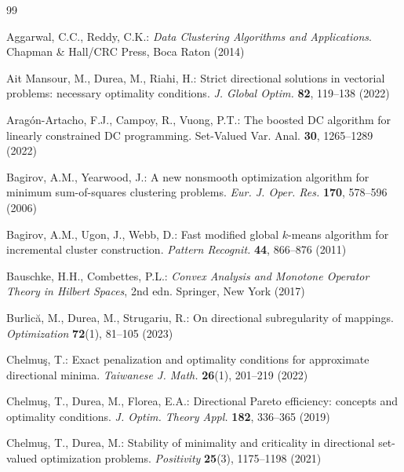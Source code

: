 \documentclass[sn-mathphys-num]{sn-jnl}%
\theoremstyle{definition}
\begin{document}
	
	\begin{thebibliography}{99}
		
		Aggarwal, C.C., Reddy, C.K.:
		\textit{Data Clustering Algorithms and Applications}.
		Chapman \& Hall/CRC Press, Boca Raton (2014)
		
		Ait Mansour, M., Durea, M., Riahi, H.:
		Strict directional solutions in vectorial problems: necessary optimality conditions.
		\textit{J. Global Optim.} \textbf{82}, 119--138 (2022)
		
		Aragón-Artacho, F.J., Campoy, R., Vuong, P.T.: The boosted DC algorithm for linearly constrained DC programming. Set-Valued Var. Anal. \textbf{30}, 1265--1289 (2022)
		
		Bagirov, A.M., Yearwood, J.:
		A new nonsmooth optimization algorithm for minimum sum-of-squares clustering problems.
		\textit{Eur. J. Oper. Res.} \textbf{170}, 578--596 (2006)
		
		Bagirov, A.M., Ugon, J., Webb, D.:
		Fast modified global $k$-means algorithm for incremental cluster construction.
		\textit{Pattern Recognit.} \textbf{44}, 866--876 (2011)
		
		
		Bauschke, H.H., Combettes, P.L.:
		\textit{Convex Analysis and Monotone Operator Theory in Hilbert Spaces}, 2nd edn.
		Springer, New York (2017)
		
		Burlic{\u{a}}, M., Durea, M., Strugariu, R.:
		On directional subregularity of mappings.
		\textit{Optimization} \textbf{72}(1), 81--105 (2023)
		
		Chelmu\c{s}, T.:
		Exact penalization and optimality conditions for approximate directional minima.
		\textit{Taiwanese J. Math.} \textbf{26}(1), 201--219 (2022)
		
		Chelmu{\c{s}}, T., Durea, M., Florea, E.A.:
		Directional Pareto efficiency: concepts and optimality conditions.
		\textit{J. Optim. Theory Appl.} \textbf{182}, 336--365 (2019)
		
		Chelmu{\c{s}}, T., Durea, M.:
		Stability of minimality and criticality in directional set-valued optimization problems.
		\textit{Positivity} \textbf{25}(3), 1175--1198 (2021)
		

\end{thebibliography}
\end{document}
